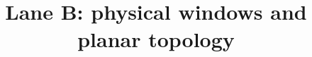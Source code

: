 \documentclass[11pt,reqno]{amsart}
\theoremstyle{plain}
\theoremstyle{definition}
\theoremstyle{remark}
\numberwithin{equation}{section}
\begin{document}
\title{Lane B: physical windows and planar topology}
\maketitle
\setcounter{section}{4}

\appendix
\setcounter{section}{1}

\end{document}
